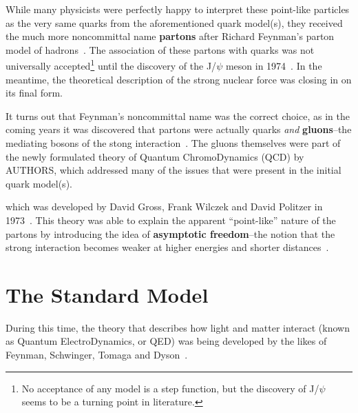 While many physicists were perfectly happy to interpret these point-like particles as the very same quarks from the aforementioned quark model(s), they received the much more noncommittal name \textbf{partons} after Richard Feynman's parton model of hadrons~\cite{Partons}. The association of these partons with quarks was not universally accepted\footnote{No acceptance of any model is a step function, but the discovery of J/$\psi$ seems to be a turning point in literature.} until the discovery of the J/$\psi$ meson in 1974~\cite{Jpsi}. In the meantime, the theoretical description of the strong nuclear force was closing in on its final form. 

It turns out that Feynman's noncommittal name was the correct choice, as in the coming years it was discovered that partons were actually quarks \textit{and} \textbf{gluons}--the mediating bosons of the stong interaction~\cite{QCDMGM}. The gluons themselves were part of the newly formulated theory of Quantum ChromoDynamics (QCD) by AUTHORS, which addressed many of the issues that were present in the initial quark model(s). 



which was developed by David Gross, Frank Wilczek and David Politzer in 1973~\cite{QCDGross, QCDWilczek, QCDPolitzer}. This theory was able to explain the apparent ``point-like'' nature of the partons by introducing the idea of \textbf{asymptotic freedom}--the notion that the strong interaction becomes weaker at higher energies and shorter distances~\cite{AsymptoticFreedom}.

\section{The Standard Model}
During this time, the theory that describes how light and matter interact (known as Quantum ElectroDynamics, or QED) was being developed by the likes of Feynman, Schwinger, Tomaga and Dyson~\cite{QEDFeymnan, QEDSchwinger, QEDTomaga, QEDDyson}. 

